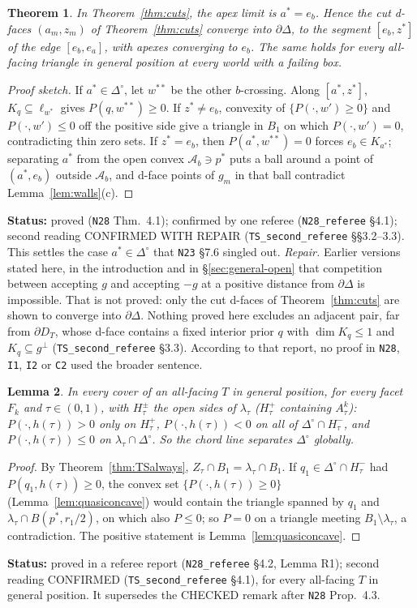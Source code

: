 \documentclass[11pt]{article}
\newtheorem{theorem}{Theorem}[section]
\newtheorem{lemma}[theorem]{Lemma}
\theoremstyle{definition}
\theoremstyle{remark}
\newcommand{\Di}{\Delta^{\circ}}
\newcommand{\src}[1]{\texttt{#1}}
\newcommand{\status}[1]{\par\smallskip\noindent\textbf{Status:} #1\par\smallskip}
\begin{document}
\begin{theorem}\label{thm:apex}
In Theorem~\ref{thm:cuts}, the apex limit is $a^*=e_b$. Hence the cut d-faces $(a_m,z_m)$ of Theorem~\ref{thm:cuts} converge into $\partial\Delta$, to the segment $[e_b,z^*]$ of the edge $[e_b,e_a]$, with apexes converging to $e_b$. The same holds for every all-facing triangle in general position at every world with a failing box.
\end{theorem}
\begin{proof}[Proof sketch]
If $a^*\in\Di$, let $w^{**}$ be the other $b$-crossing. Along $[a^*,z^*]$, $K_q\subseteq\ell_{w^*}$ gives $P(q,w^{**})\ge0$. If $z^*\ne e_b$, convexity of $\{P(\cdot,w')\ge0\}$ and $P(\cdot,w')\le0$ off the positive side give a triangle in $B_1$ on which $P(\cdot,w')=0$, contradicting thin zero sets. If $z^*=e_b$, then $P(a^*,w^{**})=0$ forces $e_b\in K_{a^*}$; separating $a^*$ from the open convex $\mathcal A_b\ni p^*$ puts a ball around a point of $(a^*,e_b)$ outside $\mathcal A_b$, and d-face points of $g_m$ in that ball contradict Lemma~\ref{lem:walls}(c).
\end{proof}
\status{proved (\src{N28} Thm.~4.1); confirmed by one referee (\src{N28\_referee} \S4.1); second reading CONFIRMED WITH REPAIR (\src{TS\_second\_referee} \S\S3.2--3.3). This settles the case $a^*\in\Di$ that \src{N23} \S7.6 singled out. \emph{Repair.} Earlier versions stated here, in the introduction and in \S\ref{sec:general-open} that competition between accepting $g$ and accepting $-g$ at a positive distance from $\partial\Delta$ is impossible. That is not proved: only the cut d-faces of Theorem~\ref{thm:cuts} are shown to converge into $\partial\Delta$. Nothing proved here excludes an adjacent pair, far from $\partial D_{T}$, whose d-face contains a fixed interior prior $q$ with $\dim K_q\le1$ and $K_q\subseteq g^\perp$ (\src{TS\_second\_referee} \S3.3). According to that report, no proof in \src{N28}, \src{I1}, \src{I2} or \src{C2} used the broader sentence.}

\begin{lemma}\label{lem:R1N28}
In every cover of an all-facing $T$ in general position, for every facet $F_k$ and $\tau\in(0,1)$, with $H^\pm_\tau$ the open sides of $\lambda_\tau$ ($H^+_\tau$ containing $A^k_\tau$): $P(\cdot,h(\tau))>0$ only on $H^+_\tau$, $P(\cdot,h(\tau))<0$ on all of $\Di\cap H^-_\tau$, and $P(\cdot,h(\tau))\le0$ on $\lambda_\tau\cap\Di$. So the chord line separates $\Di$ globally.
\end{lemma}
\begin{proof}
By Theorem~\ref{thm:TSalways}, $Z_\tau\cap B_1=\lambda_\tau\cap B_1$. If $q_1\in\Di\cap H^-_\tau$ had $P(q_1,h(\tau))\ge0$, the convex set $\{P(\cdot,h(\tau))\ge0\}$ (Lemma~\ref{lem:quasiconcave}) would contain the triangle spanned by $q_1$ and $\lambda_\tau\cap B(p^*,r_1/2)$, on which also $P\le0$; so $P=0$ on a triangle meeting $B_1\setminus\lambda_\tau$, a contradiction. The positive statement is Lemma~\ref{lem:quasiconcave}.
\end{proof}
\status{proved in a referee report (\src{N28\_referee} \S4.2, Lemma R1); second reading CONFIRMED (\src{TS\_second\_referee} \S4.1), for every all-facing $T$ in general position. It supersedes the CHECKED remark after \src{N28} Prop.~4.3.}
\end{document}
